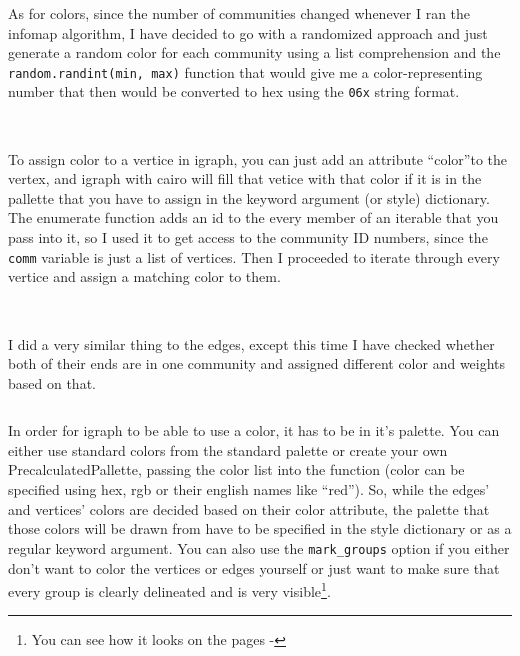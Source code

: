 \documentclass[12pt, a4paper]{article}
\begin{document}
As for colors, since the number of communities changed whenever I ran the infomap algorithm, I have decided to go with a randomized approach and just generate a random color for each community using a list comprehension and the \texttt{random.randint(min, max)} function that would give me a color-representing number that then would be converted to hex using the \texttt{06x} string format.

\bgroup
  \inputminted[linenos, breaklines=true, fontsize=\scriptsize, firstnumber=last]{python}{src/youtube/hdg_com/2_initializing_colors.py}
  \label{listing:iplot_2ic}
\egroup
\ \\
To assign color to a vertice in igraph, you can just add an attribute \textquotedblleft color\textquotedblright to the vertex, and igraph with cairo will fill that vetice with that color if it is in the pallette that you have to assign in the keyword argument (or style) dictionary. The enumerate function adds an id to the every member of an iterable that you pass into it, so I used it to get access to the community ID numbers, since the \texttt{comm}  variable is just a list of vertices. Then I proceeded to iterate through every vertice and assign a matching color to them.\\

\bgroup
  \inputminted[linenos, breaklines=true, fontsize=\scriptsize, firstnumber=last]{python}{src/youtube/hdg_com/3_colors_looping_vert.py}
  \label{listing:iplot_3cl}
\egroup
\ \\
I did a very similar thing to the edges, except this time I have checked whether both of their ends are in one community and assigned different color and weights based on that.

\bgroup
  \inputminted[linenos, breaklines=true, fontsize=\scriptsize, firstnumber=last]{python}{src/youtube/hdg_com/4_colors_looping_edge.py}
  \label{listing:iplot_3ce}
\egroup


In order for igraph to be able to use a color, it has to be in it's palette. You can either use standard colors from the standard palette or create your own PrecalculatedPallette, passing the color list into the function (color can be specified using hex, rgb or their english names like \textquotedblleft red\textquotedblright). So, while the edges' and vertices' colors are decided based on their color attribute, the palette that those colors will be drawn from have to be specified in the style dictionary or as a regular keyword argument. You can also use the \texttt{mark\_groups} option if you either don't want to color the vertices or edges yourself or just want to make sure that every group is clearly delineated and is very visible\footnote{You can see how it looks on the pages \pageref{fig:hdg_com}-\pageref{fig:hdg_com_marked}}.
\end{document}
